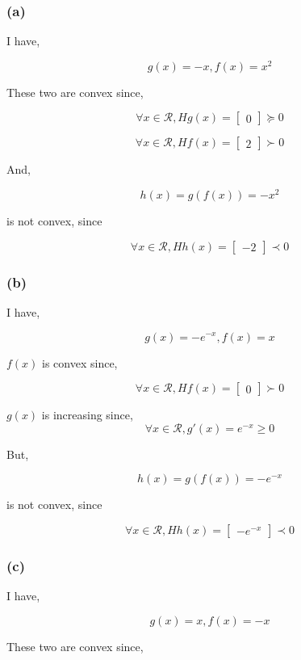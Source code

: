 \documentclass{article}
\begin{document}
\subsubsection*{(a)}

I have,

$$g(x) = -x, f(x) = x^2$$

These two are convex since,

$$\forall x \in \mathcal{R}, Hg(x)= \begin{bmatrix} 0\end{bmatrix} \succeq 0$$

$$\forall x \in \mathcal{R}, Hf(x)= \begin{bmatrix} 2\end{bmatrix} \succ 0$$

And,

$$h(x) = g(f(x)) = -x^2$$

is not convex, since

$$\forall x \in \mathcal{R}, Hh(x)= \begin{bmatrix} -2\end{bmatrix} \prec 0$$
\subsubsection*{(b)}

I have,

$$g(x) = -e^{-x}, f(x) = x$$

$f(x)$ is convex since, 

$$\forall x \in \mathcal{R}, Hf(x)= \begin{bmatrix} 0\end{bmatrix} \succ 0$$

$g(x)$ is increasing since, 
$$\forall x \in \mathcal{R}, g'(x) = e^{-x} \ge 0$$

But, 

$$h(x) = g(f(x)) = -e^{-x} $$

is not convex, since

$$\forall x \in \mathcal{R}, Hh(x)= \begin{bmatrix} -e^{-x}\end{bmatrix} \prec 0$$

\subsubsection*{(c)}

I have,

$$g(x) = x, f(x) = -x$$

These two are convex since,
\end{document}
